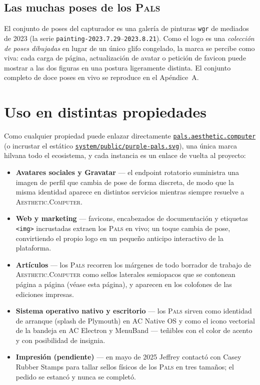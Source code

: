 \documentclass[10pt,letterpaper,twocolumn]{article}
\newcommand{\ac}{\textsc{Aesthetic}{\color{acpink}.}\textsc{Computer}}
\newcommand{\pals}{\textsc{Pals}}
\newcommand{\repofile}[1]{\href{https://github.com/whistlegraph/aesthetic-computer/blob/main/#1}{\texttt{#1}}}
\begin{document}
\subsection{Las muchas poses de los \pals{}}

El conjunto de poses del capturador es una galería de pinturas \texttt{wgr} de
mediados de 2023 (la serie \texttt{painting-2023.7.29}--\texttt{2023.8.21}).
Como el logo es una \emph{colección de poses dibujadas} en lugar de un único
glifo congelado, la marca se percibe como viva: cada carga de página,
actualización de avatar o petición de favicon puede mostrar a las dos figuras
en una postura ligeramente distinta. El conjunto completo de doce poses en
vivo se reproduce en el Apéndice~A.

\section{Uso en distintas propiedades}

Como cualquier propiedad puede enlazar directamente
\href{https://pals.aesthetic.computer}{\texttt{pals.aesthetic.computer}}
(o incrustar el estático
\repofile{system/public/purple-pals.svg}), una única marca hilvana todo el
ecosistema, y cada instancia es un enlace de vuelta al proyecto:

\begin{itemize}
  \item \textbf{Avatares sociales y Gravatar} --- el endpoint rotatorio
        suministra una imagen de perfil que cambia de pose de forma discreta,
        de modo que la misma identidad aparece en distintos servicios mientras
        siempre resuelve a \ac{}.
  \item \textbf{Web y marketing} --- favicons, encabezados de documentación y
        etiquetas \texttt{<img>} incrustadas extraen los \pals{} en vivo; un
        toque cambia de pose, convirtiendo el propio logo en un pequeño
        anticipo interactivo de la plataforma.
  \item \textbf{Artículos} --- los \pals{} recorren los márgenes de todo
        borrador de trabajo de \ac{} como sellos laterales semiopacos que se
        contonean página a página (véase esta página), y aparecen en los
        colofones de las ediciones impresas.
  \item \textbf{Sistema operativo nativo y escritorio} --- los \pals{} sirven
        como identidad de arranque (splash de Plymouth) en AC Native OS y como
        el icono vectorial de la bandeja en AC Electron y MenuBand ---
        teñibles con el color de acento y con posibilidad de insignia.
  \item \textbf{Impresión (pendiente)} --- en mayo de 2025 Jeffrey contactó
        con Casey Rubber Stamps para tallar sellos físicos de los \pals{} en
        tres tamaños; el pedido se estancó y nunca se completó.
\end{itemize}
\end{document}
